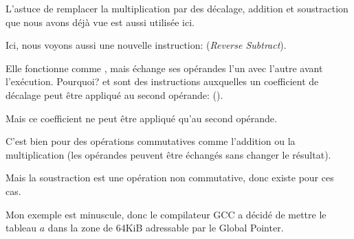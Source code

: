 L'astuce de remplacer la multiplication par des décalage, addition et soustraction
que nous avons déjà vue est aussi utilisée ici.

Ici, nous voyons aussi une nouvelle instruction: \RSB (\emph{Reverse Subtract}).

Elle fonctionne comme \SUB, mais échange ses opérandes l'un avec l'autre avant l'exécution.
Pourquoi?
\SUB et \RSB sont des instructions auxquelles un coefficient de décalage peut être
appliqué au second opérande: ().

Mais ce coefficient ne peut être appliqué qu'au second opérande.

C'est bien pour des opérations commutatives comme l'addition ou la multiplication
(les opérandes peuvent être échangés sans changer le résultat).

Mais la soustraction est une opération non commutative, donc \RSB existe pour ces
cas.


Mon exemple est minuscule, donc le compilateur GCC a décidé de mettre le tableau
$a$ dans la zone de 64KiB adressable par le Global Pointer.



